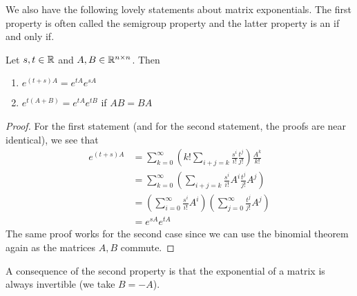 We also have the following lovely statements about matrix exponentials. The first property is often called the semigroup property and the latter property is an if and only if.
\begin{lemma} Let $s, t \in \mathbb{R}$ and $A, B \in \mathbb{R}^{n \times n}$. Then
\begin{enumerate}
    \item $e^{(t + s)A} = e^{tA} e^{sA}$
    \item $e^{t(A + B)} = e^{tA} e^{tB}$ if $AB = BA$
\end{enumerate}
\end{lemma}
\begin{proof}
For the first statement (and for the second statement, the proofs are near identical), we see that
\begin{align*}
    e^{(t + s)A} &= \sum_{k = 0}^{\infty} \left( k! \sum_{i + j = k} \frac{s^i}{i!} \frac{t^j}{j!} \right) \frac{A^k}{k!} \\
    &= \sum_{k = 0}^{\infty} \left( \sum_{i + j = k} \frac{s^i}{i!} A^i \frac{t^j}{j!} A^j  \right)\\
    &= \left( \sum_{i = 0}^{\infty} \frac{s^i}{i!} A^i \right) \left( \sum_{j = 0}^{\infty} \frac{t^j}{j!} A^j \right)\\
    &= e^{sA} e^{tA}
\end{align*}
The same proof works for the second case since we can use the binomial theorem again as the matrices $A, B$ commute.
\end{proof}
A consequence of the second property is that the exponential of a matrix is always invertible (we take $B = -A$). 

